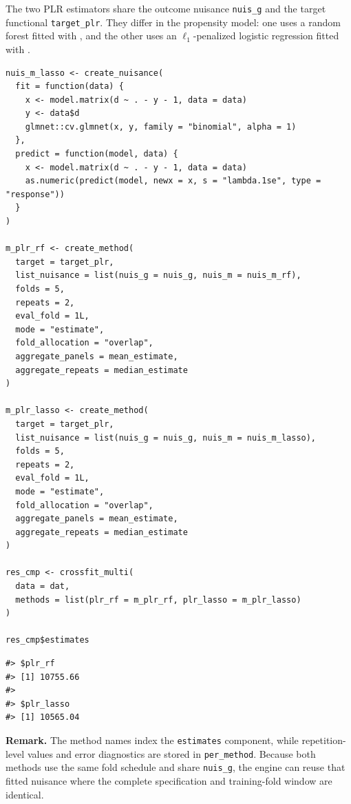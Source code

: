 The two PLR estimators share the outcome nuisance \texttt{nuis\_g} and the target functional \texttt{target\_plr}. They differ in the propensity model: one uses a random forest fitted with  \citep{ranger}, and the other uses an \(\ell_1\)-penalized logistic regression fitted with  \citep{friedman2010glmnet, tay2023glmnet}.

\begin{verbatim}
nuis_m_lasso <- create_nuisance(
  fit = function(data) {
    x <- model.matrix(d ~ . - y - 1, data = data)
    y <- data$d
    glmnet::cv.glmnet(x, y, family = "binomial", alpha = 1)
  },
  predict = function(model, data) {
    x <- model.matrix(d ~ . - y - 1, data = data)
    as.numeric(predict(model, newx = x, s = "lambda.1se", type = "response"))
  }
)

m_plr_rf <- create_method(
  target = target_plr,
  list_nuisance = list(nuis_g = nuis_g, nuis_m = nuis_m_rf),
  folds = 5,
  repeats = 2,
  eval_fold = 1L,
  mode = "estimate",
  fold_allocation = "overlap",
  aggregate_panels = mean_estimate,
  aggregate_repeats = median_estimate
)

m_plr_lasso <- create_method(
  target = target_plr,
  list_nuisance = list(nuis_g = nuis_g, nuis_m = nuis_m_lasso),
  folds = 5,
  repeats = 2,
  eval_fold = 1L,
  mode = "estimate",
  fold_allocation = "overlap",
  aggregate_panels = mean_estimate,
  aggregate_repeats = median_estimate
)

res_cmp <- crossfit_multi(
  data = dat,
  methods = list(plr_rf = m_plr_rf, plr_lasso = m_plr_lasso)
)

res_cmp$estimates
\end{verbatim}

\begin{verbatim}
#> $plr_rf
#> [1] 10755.66
#> 
#> $plr_lasso
#> [1] 10565.04
\end{verbatim}

\textbf{Remark.} The method names index the \texttt{estimates} component, while repetition-level values and error diagnostics are stored in \texttt{per\_method}. Because both methods use the same fold schedule and share \texttt{nuis\_g}, the engine can reuse that fitted nuisance where the complete specification and training-fold window are identical.



\address{%
Etienne Peyrot\\
Université Paris Cité and Université Sorbonne Paris Nord, Inserm, INRAE, Center for Research in Epidemiology and StatisticS (CRESS)\\%
F-75004 Paris, France\\
%
%
\textit{ORCID: \href{https://orcid.org/0009-0006-8520-6201}{0009-0006-8520-6201}}\\%
\href{mailto:etienne.peyrot@inserm.fr}{\nolinkurl{etienne.peyrot@inserm.fr}}%
}

